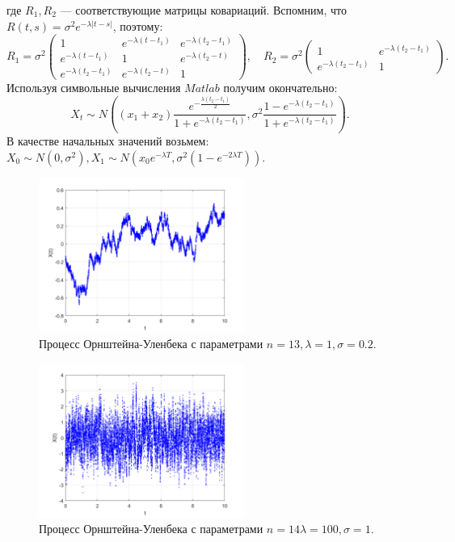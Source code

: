 \documentclass[oneside, final, 12pt]{article}
\begin{document}
	где $R_1, R_2$ --- соответствующие матрицы ковариаций. Вспомним, что 
		$R(t,s) = \sigma^2e^{-\lambda|t-s|}$, поэтому:
	$$
		R_1 = \sigma^2 \begin{pmatrix} 	1 & e^{-\lambda(t-t_1)} & e^{-\lambda(t_2-t_1)} \\
															 e^{-\lambda(t-t_1)} & 1 & e^{-\lambda(t_2-t)} \\
															 e^{-\lambda(t_2-t_1)} & e^{-\lambda(t_2-t)} & 1 \end{pmatrix}, \quad
		R_2 = \sigma^2 \begin{pmatrix} 1 & e^{-\lambda(t_2-t_1)} \\ e^{-\lambda(t_2-t_1)} & 1 \end{pmatrix}.
	$$
	Используя символьные вычисления $Matlab$ получим окончательно:
	$$
		X_t \sim N\left( 
									(x_1+x_2)\dfrac{e^{-\frac{\lambda(t_2-t_1)}{2}}}{1+e^{-\lambda(t_2-t_1)}},
									\sigma^2 \dfrac{1-e^{-\lambda(t_2-t_1)}}{1+e^{-\lambda(t_2-t_1)}}
						 \right).
	$$	
	В качестве начальных значений возьмем: $X_0 \sim N(0,\sigma^2), 
																			X_1 \sim N(x_0e^{-\lambda T},\sigma^2(1-e^{-2\lambda T})).$	
	\begin{figure}[h!]
		\centering
		\includegraphics[width=0.6\textwidth]{../code/Task_9/pict/ou_13_1_20_ex.png}
		\caption{Процесс Орнштейна-Уленбека с параметрами $n = 13, \lambda = 1, \sigma = 0.2$. }
    \end{figure}
    \newpage
    \begin{figure}[h!]
		\centering
		\includegraphics[width=0.6\textwidth]{../code/Task_9/pict/ou_14_100_1_ex.png}
		\caption{Процесс Орнштейна-Уленбека с параметрами  $n = 14 \lambda = 100, \sigma = 1$.}
    \end{figure}
\end{document}
